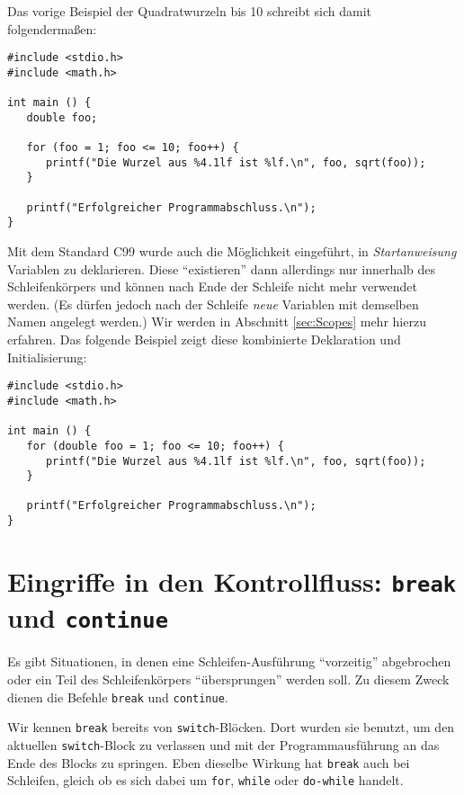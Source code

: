 Das vorige Beispiel der Quadratwurzeln bis 10 schreibt sich damit folgendermaßen:

\begin{codebox}
\begin{verbatim}
#include <stdio.h>
#include <math.h>

int main () {
   double foo;
   
   for (foo = 1; foo <= 10; foo++) {
      printf("Die Wurzel aus %4.1lf ist %lf.\n", foo, sqrt(foo));
   }
   
   printf("Erfolgreicher Programmabschluss.\n");
}
\end{verbatim}
\end{codebox}

Mit dem Standard C99 wurde auch die Möglichkeit eingeführt, in \emph{Startanweisung} Variablen zu deklarieren. Diese \enquote{existieren} dann allerdings nur innerhalb des Schleifenkörpers und können nach Ende der Schleife nicht mehr verwendet werden. (Es dürfen jedoch nach der Schleife \emph{neue} Variablen mit demselben Namen angelegt werden.) Wir werden in Abschnitt \ref{sec:Scopes} mehr hierzu erfahren. Das folgende Beispiel zeigt diese kombinierte Deklaration und Initialisierung:

\begin{codebox}
\begin{verbatim}
#include <stdio.h>
#include <math.h>

int main () {
   for (double foo = 1; foo <= 10; foo++) {
      printf("Die Wurzel aus %4.1lf ist %lf.\n", foo, sqrt(foo));
   }
   
   printf("Erfolgreicher Programmabschluss.\n");
}
\end{verbatim}
\end{codebox}

\section{Eingriffe in den Kontrollfluss: \texttt{break} und \texttt{continue}} \label{sec:ControlFluxAdjustment}
Es gibt Situationen, in denen eine Schleifen-Ausführung \enquote{vorzeitig} abgebrochen oder ein Teil des Schleifenkörpers \enquote{übersprungen} werden soll. Zu diesem Zweck dienen die Befehle \texttt{break} und \texttt{continue}.

Wir kennen \texttt{break} bereits von \texttt{switch}-Blöcken. Dort wurden sie benutzt, um den aktuellen \texttt{switch}-Block zu verlassen und mit der Programmausführung an das Ende des Blocks zu springen. Eben dieselbe Wirkung hat \texttt{break} auch bei Schleifen, gleich ob es sich dabei um \texttt{for}, \texttt{while} oder \texttt{do-while} handelt.

